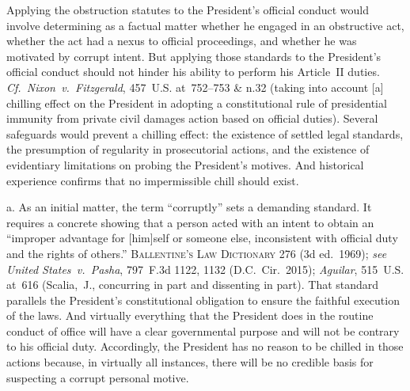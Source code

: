 Applying the obstruction statutes to the President's official conduct would involve determining as a factual matter whether he engaged in an obstructive act, whether the act had a nexus to official proceedings, and whether he was motivated by corrupt intent.
But applying those standards to the President's official conduct should not hinder his ability to perform his Article~II duties.
\textit{Cf.~Nixon~v.\ Fitzgerald}, 457~U.S. at~752--753 \& n.32 (taking into account [a] chilling effect on the President in adopting a constitutional rule of presidential immunity from private civil damages action based on official duties).
Several safeguards would prevent a chilling effect: the existence of settled legal standards, the presumption of regularity in prosecutorial actions, and the existence of evidentiary limitations on probing the President's motives.
And historical experience confirms that no impermissible chill should exist.

a. As an initial matter, the term ``corruptly'' sets a demanding standard.
It requires a concrete showing that a person acted with an intent to obtain an ``improper advantage for [him]self or someone else, inconsistent with official duty and the rights of others.'' \textsc{Ballentine's Law Dictionary} 276 (3d ed.~1969);
\textit{see United States~v.\ Pasha}, 797~F.3d 1122, 1132 (D.C.~Cir.~2015);
\textit{Aguilar}, 515~U.S. at~616 (Scalia,~J., concurring in part and dissenting in part).
That standard parallels the President's constitutional obligation to ensure the faithful execution of the laws.
And virtually everything that the President does in the routine conduct of office will have a clear governmental purpose and will not be contrary to his official duty.
Accordingly, the President has no reason to be chilled in those actions because, in virtually all instances, there will be no credible basis for suspecting a corrupt personal motive.

